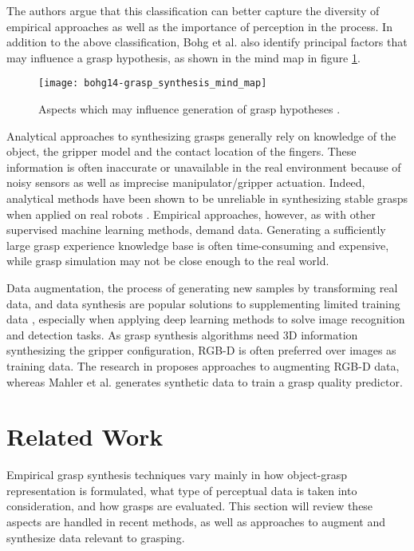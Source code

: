 The authors argue that this classification can better capture the diversity of empirical approaches as well as
the importance of perception in the process. In addition to the above classification, Bohg et al. \cite{Bohg2014}
also identify principal factors that may influence a grasp hypothesis, as shown in the mind map in figure
\ref{fig:grasp_synthesis_mind_map}.

\begin{figure}[H]
    \centering
    \texttt{[image: bohg14-grasp\_synthesis\_mind\_map]}
    \caption{Aspects which may influence generation of grasp hypotheses \cite{Bohg2014}.}
    \label{fig:grasp_synthesis_mind_map}
\end{figure}

Analytical approaches to synthesizing grasps generally rely on knowledge of the object, the gripper model and the
contact location of the fingers. These information is often inaccurate or unavailable in the real environment
because of noisy sensors as well as imprecise manipulator/gripper actuation. Indeed, analytical methods have been
shown to be unreliable in synthesizing stable grasps when applied on real robots
\cite{Kappler2015, Rubert2017, WeiszAllen2012}. Empirical approaches, however, as with other supervised machine
learning methods, demand data. Generating a sufficiently large grasp experience knowledge base is often time-consuming
and expensive, while grasp simulation may not be close enough to the real world.

Data augmentation, the process of generating new samples by transforming real data, and data synthesis are popular
solutions to supplementing limited training data \cite{Fawzi2016, Shrivastava2017}, especially when applying deep
learning methods to solve image recognition and detection tasks. As grasp synthesis algorithms need 3D information
synthesizing the gripper configuration, RGB-D is often preferred over images as training data. The research in
\cite{Eitel2015,Gupta2014RGBDFeatures} proposes approaches to augmenting RGB-D data, whereas Mahler et al.
\cite{mahler2017} generates synthetic data to train a grasp quality predictor.



\section{Related Work}
Empirical grasp synthesis techniques vary mainly in how object-grasp representation is formulated, what type of
perceptual data is taken into consideration, and how grasps are evaluated. This section will review these aspects
are handled in recent methods, as well as approaches to augment and synthesize data relevant to grasping.

